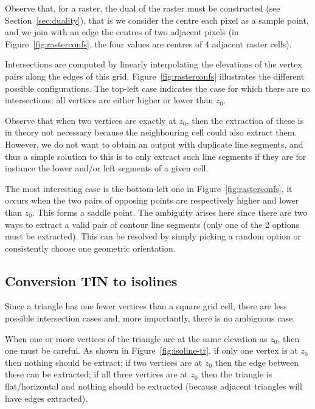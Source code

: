 
Observe that, for a raster, the dual of the raster must be constructed (see Section~\ref{sec:duality}), that is we consider the centre each pixel as a sample point, and we join with an edge the centres of two adjacent pixels (in Figure~\ref{fig:rasterconfs}, the four values are centres of 4 adjacent raster cells).

Intersections are computed by linearly interpolating the elevations of the vertex pairs along the edges of this grid.
Figure~\ref{fig:rasterconfs} illustrates the different possible configurations. 
The top-left case indicates the case for which there are no intersections: all vertices are either higher or lower than $z_0$. 

Observe that when two vertices are exactly at $z_0$, then the extraction of these is in theory not necessary because the neighbouring cell could also extract them. 
However, we do not want to obtain an output with duplicate line segments, and thus a simple solution to this is to only extract such line segments if they are for instance the lower and/or left segments of a given cell.

The most interesting case is the bottom-left one in Figure~\ref{fig:rasterconfs}, it occurs when the two pairs of opposing points are respectively higher and lower than $z_0$.
This forms a saddle point. 
The ambiguity arises here since there are two ways to extract a valid pair of contour line segments (only one of the 2 options must be extracted).
This can be resolved by simply picking a random option or consistently choose one geometric orientation. 


\subsection{Conversion TIN to isolines}%
\label{sec:tin-iso}

Since a triangle has one fewer vertices than a square grid cell, there are less possible intersection cases and, more importantly, there is no ambiguous case. 

When one or more vertices of the triangle are at the same elevation as $z_0$, then one must be careful.
As shown in Figure~\ref{fig:isoline-tr}, if only one vertex is at $z_0$ then nothing should be extract; if two vertices are at $z_0$ then the edge between these can be extracted; if all three vertices are at $z_0$ then the triangle is flat/horizontal and nothing should be extracted (because adjacent triangles will have edges extracted).

